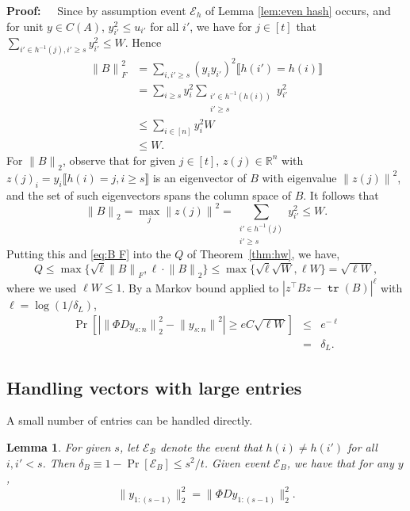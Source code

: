 \documentclass{sig-alternate}
\newcommand{\norm}[1]{{\| #1 \|}}
\newcommand{\cE}{\mathcal{E}}
\DeclareMathOperator{\tr}{\mathtt{tr}}
\newcommand{\Ibr}[1]{\llbracket#1\rrbracket}
\newcommand\scn{_{s:n}}
\newcommand{\R}{{\mathbb R}}
\newtheorem{lemma}[theorem]{Lemma}
\def\FullBox{\hbox{\vrule width 8pt height 8pt depth 0pt}}
\def\qed{\ifmmode\qquad\FullBox\else{\unskip\nobreak\hfil
\penalty50\hskip1em\null\nobreak\hfil\FullBox
\parfillskip=0pt\finalhyphendemerits=0\endgraf}\fi}
\newenvironment{proof}{\begin{trivlist} \item {\bf Proof:~~}}
  {\qed\end{trivlist}}
\begin{document}
\begin{proof}
Since by assumption event $\cE_h$ of Lemma \ref{lem:even hash} occurs,
and for unit $y\in C(A)$, $y_{i'}^2 \leq u_{i'}$ for all $i'$,
we have for $j\in [t]$ that
$\sum_{i' \in h^{-1}(j), i'\ge s} y^2_{i'} \le W$. Hence
\begin{align}\label{eq:B F}
\norm{B}_F^2
	  & = \sum_{i, i'\ge s} (y_i y_{i'} )^2 \Ibr{h(i')=h(i)}\nonumber
	\\ & = \sum_{i\ge s} y^2_i  \sum_{\substack{i' \in h^{-1}(h(i))\\ i'\ge s}} y^2_{i'}\nonumber
	\\ & \le \sum_{i\in [n]} y^2_i W\nonumber
	\\ & \le W.
\end{align}
For $\norm{B}_2$, observe that for given $j\in [t]$,
$z(j) \in\R^n$ with $z(j)_i = y_i \Ibr{h(i)=j, i\ge s}$ is an eigenvector of $B$
with eigenvalue $\norm{z(j)}^2$,
and the set of such eigenvectors spans the column space of $B$. It follows
that 
\[
\norm{B}_2 = \max_{j}\norm{z(j)}^2
	= \sum_{\substack{i' \in h^{-1}(j)\\ i'\ge s}} y^2_{i'} \le W.
\]
Putting this and \eqref{eq:B F} into the $Q$ of Theorem~\ref{thm:hw},
we have, \[
Q \le \max \{ \sqrt{\ell}\norm{B}_F, \ell \cdot\norm{B}_2\}
	\le \max\{ \sqrt{\ell}\sqrt{W}, \ell W \} =\sqrt{\ell W},
\]
where we used $\ell W \leq 1$. 
By a Markov bound applied to $| z^\top Bz - \tr(B)| ^\ell$
with $\ell = \log(1/\delta_L)$,
\begin{eqnarray*}
\Pr[ | \norm{\Phi D y\scn}_2^2 - \norm{y\scn}^2 | \ge e C \sqrt{\ell W}]
	& \le & e^{-\ell}\\
	& = & \delta_L.
\end{eqnarray*}
\end{proof}







\subsection{Handling vectors with large entries}\label{sec:large}

A small number of entries can be handled directly.

\begin{lemma}\label{lem:birthday}
For given $s$, let $\mathcal{E_B}$ denote the event that $h(i)\ne h(i')$ for all $i , i' < s$.
Then $\delta_B \equiv 1 -\Pr[\cE_B] \le s^2/t$.
Given event $\cE_B$, we have that for any $y$,
\[
\|y_{1:(s-1)}\|_2^2 = \|\Phi Dy_{1:(s-1)}\|_2^2.
\]
\end{lemma}
\end{document}
